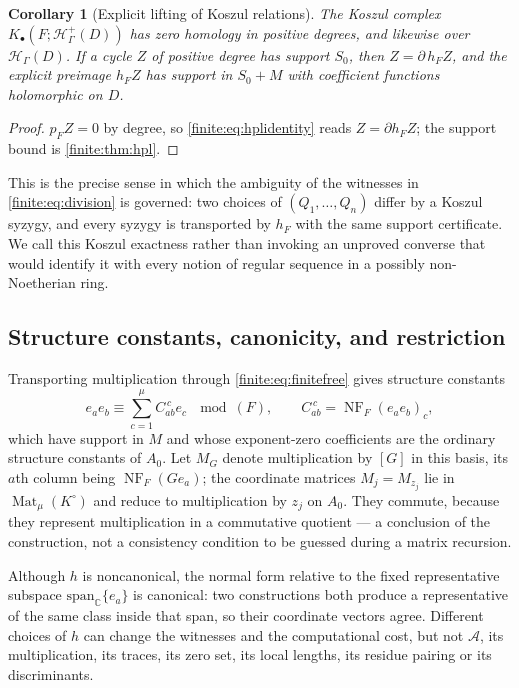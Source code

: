 \documentclass[11pt,letterpaper]{article}
\newtheorem{corollary}[theorem]{Corollary}
\theoremstyle{definition}
\theoremstyle{remark}
\newcommand{\C}{\mathbb C}
\newcommand{\HH}{\mathscr H}
\newcommand{\Hp}{\mathscr H^{+}}
\newcommand{\Alg}{\mathcal A}
\newcommand{\Kc}{K^{\circ}}
\DeclareMathOperator{\NF}{NF}
\DeclareMathOperator{\Mat}{Mat}
\numberwithin{equation}{section}
\begin{document}
\begin{corollary}[Explicit lifting of Koszul relations]
\label{finite:cor:koszul}
The Koszul complex $K_\bullet(F;\Hp_\Gamma(D))$ has zero homology in positive degrees, and likewise over $\HH_\Gamma(D)$. If a cycle $Z$ of positive degree has support $S_0$, then $Z=\partial\,h_FZ$, and the explicit preimage $h_FZ$ has support in $S_0+M$ with coefficient functions holomorphic on $D$.
\end{corollary}

\begin{proof}
$p_FZ=0$ by degree, so \eqref{finite:eq:hplidentity} reads $Z=\partial h_FZ$; the support bound is \cref{finite:thm:hpl}.
\end{proof}

This is the precise sense in which the ambiguity of the witnesses in \eqref{finite:eq:division} is governed: two choices of $(Q_1,\ldots,Q_n)$ differ by a Koszul syzygy, and every syzygy is transported by $h_F$ with the same support certificate. We call this Koszul exactness rather than invoking an unproved converse that would identify it with every notion of regular sequence in a possibly non-Noetherian ring.

\subsection{Structure constants, canonicity, and restriction}
\label{finite:sec:structure}

Transporting multiplication through \eqref{finite:eq:finitefree} gives structure constants
\begin{equation}\label{finite:eq:structure}
 e_ae_b\equiv\sum_{c=1}^{\mu}C_{ab}^{\,c}e_c\ \ \bmod (F),
 \qquad C_{ab}^{\,c}=\NF_F(e_ae_b)_c,
\end{equation}
which have support in $M$ and whose exponent-zero coefficients are the ordinary structure constants of $A_0$. Let $M_G$ denote multiplication by $[G]$ in this basis, its $a$th column being $\NF_F(Ge_a)$; the coordinate matrices $M_j=M_{z_j}$ lie in $\Mat_\mu(\Kc)$ and reduce to multiplication by $z_j$ on $A_0$. They commute, because they represent multiplication in a commutative quotient --- a conclusion of the construction, not a consistency condition to be guessed during a matrix recursion.

Although $h$ is noncanonical, the normal form relative to the fixed representative subspace $\mathrm{span}_\C\{e_a\}$ is canonical: two constructions both produce a representative of the same class inside that span, so their coordinate vectors agree. Different choices of $h$ can change the witnesses and the computational cost, but not $\Alg$, its multiplication, its traces, its zero set, its local lengths, its residue pairing or its discriminants.
\end{document}
